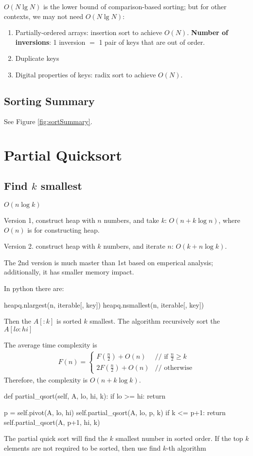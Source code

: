 $O(N\lg N)$ is the lower bound of comparison-based sorting; but for other
contexts, we may not need $O(N \lg N)$:
\begin{enumerate}
\item Partially-ordered arrays: insertion sort to achieve $O(N)$. \textbf{Number of inversions}: 1 inversion $=$ 1 pair of keys that are out
of order.
\item Duplicate keys
\item Digital properties of keys: radix sort to achieve $O(N)$.
\end{enumerate}

\subsection{Sorting Summary}
See Figure \ref{fig:sortSummary}.
\begin{figure*}[hbtp]
\centering
{}
\caption{Sort summary}
\label{fig:sortSummary} 
\end{figure*}
\section{Partial Quicksort}
\subsection{Find $k$ smallest}
 $O(n \log k)$

Version 1, construct heap with $n$ numbers, and take $k$: $O(n+k\log n)$, where $O(n)$ is for constructing heap. 

Version 2. construct heap with $k$ numbers, and iterate $n$: $O(k+n\log k)$. 

The 2nd version is much master than 1st based on emperical analysis; additionally, it has smaller memory impact. 

In python there are:
\begin{python}
heapq.nlargest(n, iterable[, key])
heapq.nsmallest(n, iterable[, key])
\end{python}

\newpage
{}  Then the $A[:k]$ is sorted $k$ smallest. The algorithm recursively sort the $A[lo:hi]$

The average time complexity is
\begin{eqnarray*}
F(n) = \left\{ \begin{array}{rl}
  F(\frac{n}{2})+O(n) &\mbox{// if $\frac{n}{2} \geq k$} \\
  2F(\frac{n}{2})+O(n) &\mbox{// otherwise}
       \end{array} \right.
\end{eqnarray*}
Therefore, the complexity is $O(n+k \log k)$.
\begin{python}
def partial_qsort(self, A, lo, hi, k):
    if lo >= hi: return

    p = self.pivot(A, lo, hi)
    self.partial_qsort(A, lo, p, k)
    if k <= p+1: return
    self.partial_qsort(A, p+1, hi, k)
\end{python}
The partial quick sort will find the $k$ smallest number in sorted order. If the top $k$ elements are not required to be sorted, then use find $k$-th algorithm 

